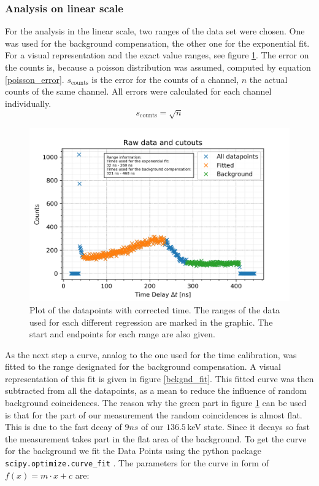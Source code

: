 \documentclass[30pt,a4paper]{article}
\begin{document}
 	\subsubsection{Analysis on linear scale}
 	For the analysis in the linear scale, two ranges of the data set were chosen.
 	One	was used for the background compensation, the other one for the exponential fit.
 	For a visual representation and the exact value ranges, see figure \ref{raw_plot}.
 	The error on the counts is, because a poisson distribution was assumed, computed by
 	equation \ref{poisson_error}. $s_{\text{counts}}$ is the error for the counts of a channel, $n$  the actual counts of the same channel. All errors were calculated for each channel individually.
 	\begin{equation}
 	s_{\text{counts}}=\sqrt{n}
 	\label{poisson_error}
 	\end{equation}
 	
 	
 	\begin{figure}[h]
 		\includegraphics{Bilder/raw_ranges}
 		\centering
 		\caption[Raw Data Counts]{\small Plot of the datapoints with corrected time. The ranges of the data used for each different regression are marked in the graphic. The start and endpoints for each range are also given.}
 		\label{raw_plot}
 	\end{figure}
 	
 	As the next step a curve, analog to the one used for the time calibration, was
 	fitted to the range designated for the background compensation. A visual
 	representation of this fit is given in figure \ref{bckgnd_fit}. This fitted curve
 	was then subtracted from all the datapoints, as a mean to reduce the influence of
 	random background coincidences. The reason why the green part in figure \ref{raw_plot} can be used is that for the part of our measurement the random coincidences is almost flat. This is due to the fast decay of $9ns$ of our $136.5$\,keV state. Since it decays so fast the measurement takes part in the flat area of the background. To get the curve for the background we fit the Data Points using the python package \verb|scipy.optimize.curve_fit| \cite{SciPy_Opti}.
 	The parameters for the curve in form of $f(x)=m\cdot x+c$ are:
 	
\end{document}
